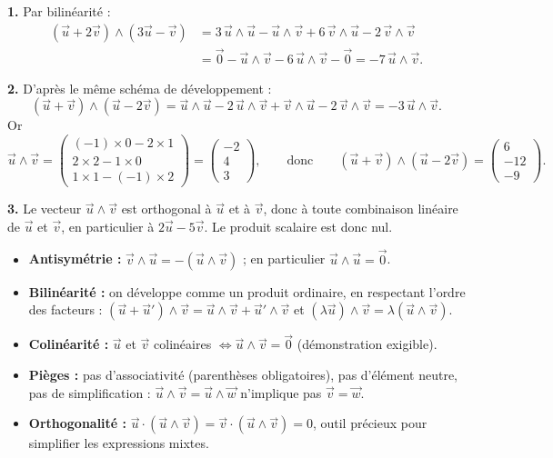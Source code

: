 \documentclass[11pt]{article}
\begin{document}
\begin{corrige}
\textbf{1.} Par bilinéarité :
\begin{align*}
(\vec{u}+2\vec{v})\wedge(3\vec{u}-\vec{v})
&= 3\,\vec{u}\wedge\vec{u}-\vec{u}\wedge\vec{v}+6\,\vec{v}\wedge\vec{u}-2\,\vec{v}\wedge\vec{v}\\
&= \vec{0}-\vec{u}\wedge\vec{v}-6\,\vec{u}\wedge\vec{v}-\vec{0}
= -7\,\vec{u}\wedge\vec{v}.
\end{align*}

\textbf{2.} D'après le même schéma de développement :
\[
(\vec{u}+\vec{v})\wedge(\vec{u}-2\vec{v})=\vec{u}\wedge\vec{u}-2\,\vec{u}\wedge\vec{v}+\vec{v}\wedge\vec{u}-2\,\vec{v}\wedge\vec{v}=-3\,\vec{u}\wedge\vec{v}.
\]
Or
\[
\vec{u}\wedge\vec{v}
=\begin{pmatrix} (-1)\times0-2\times1 \\ 2\times2-1\times0 \\ 1\times1-(-1)\times2 \end{pmatrix}
=\begin{pmatrix} -2 \\ 4 \\ 3 \end{pmatrix},
\qquad\text{donc}\qquad
(\vec{u}+\vec{v})\wedge(\vec{u}-2\vec{v})=\begin{pmatrix} 6 \\ -12 \\ -9 \end{pmatrix}.
\]

\textbf{3.} Le vecteur $\vec{u}\wedge\vec{v}$ est orthogonal à $\vec{u}$ et à $\vec{v}$, donc à toute combinaison linéaire de $\vec{u}$ et $\vec{v}$, en particulier à $2\vec{u}-5\vec{v}$. Le produit scalaire est donc nul.
\end{corrige}

\begin{aretenir}
\begin{itemize}
\item \textbf{Antisymétrie :} $\vec{v}\wedge\vec{u}=-(\vec{u}\wedge\vec{v})$ ; en particulier $\vec{u}\wedge\vec{u}=\vec{0}$.
\item \textbf{Bilinéarité :} on développe comme un produit ordinaire, en respectant l'ordre des facteurs : $(\vec{u}+\vec{u}')\wedge\vec{v}=\vec{u}\wedge\vec{v}+\vec{u}'\wedge\vec{v}$ et $(\lambda\vec{u})\wedge\vec{v}=\lambda(\vec{u}\wedge\vec{v})$.
\item \textbf{Colinéarité :} $\vec{u}$ et $\vec{v}$ colinéaires $\iff \vec{u}\wedge\vec{v}=\vec{0}$ (démonstration exigible).
\item \textbf{Pièges :} pas d'associativité (parenthèses obligatoires), pas d'élément neutre, pas de simplification : $\vec{u}\wedge\vec{v}=\vec{u}\wedge\vec{w}$ n'implique pas $\vec{v}=\vec{w}$.
\item \textbf{Orthogonalité :} $\vec{u}\cdot(\vec{u}\wedge\vec{v})=\vec{v}\cdot(\vec{u}\wedge\vec{v})=0$, outil précieux pour simplifier les expressions mixtes.
\end{itemize}
\end{aretenir}
\end{document}
